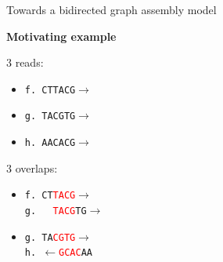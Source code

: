 \documentclass[xcolor=dvipsnames]{beamer}
\begin{document}
\begin{frame}{Towards a bidirected graph assembly model}
    \vspace{-1.0cm}
    \begin{center}
        {\bf Motivating example}
    \end{center}
    \vspace{-0.5cm}
    \begin{minipage}{0.49\textwidth}
        3 reads:
        \begin{itemize}
            \item {\tt f. CTTACG$\rightarrow$}
            \item {\tt g. TACGTG$\rightarrow$}
            \item {\tt h. AACACG$\rightarrow$}
        \end{itemize}
        3 overlaps:
        \begin{itemize}
            \item {\tt f. CT\textcolor{red}{TACG}$\rightarrow$} \\
                {\tt g. \ \ \textcolor{red}{TACG}TG$\rightarrow$}

            \item {\tt g. TA\textcolor{red}{CGTG}$\rightarrow$} \\
                {\tt h. \hspace{0.023cm}$\leftarrow$\textcolor{red}{GCAC}AA}


\end{itemize}
\end{minipage}
\end{frame}
\end{document}
